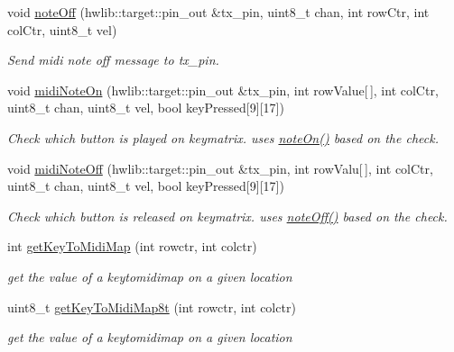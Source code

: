\begin{DoxyCompactItemize}
void \hyperlink{classlight_music_1_1midi_a6f47e6a388993c88f087a231a4e8f776}{note\+Off} (hwlib\+::target\+::pin\+\_\+out \&tx\+\_\+pin, uint8\+\_\+t chan, int row\+Ctr, int col\+Ctr, uint8\+\_\+t vel)
\begin{DoxyCompactList}\small\item\em Send midi note off message to tx\+\_\+pin. \end{DoxyCompactList}\item 
void \hyperlink{classlight_music_1_1midi_acc93cbd42e1d1257644f0102283b3db3}{midi\+Note\+On} (hwlib\+::target\+::pin\+\_\+out \&tx\+\_\+pin, int row\+Value\mbox{[}$\,$\mbox{]}, int col\+Ctr, uint8\+\_\+t chan, uint8\+\_\+t vel, bool key\+Pressed\mbox{[}9\mbox{]}\mbox{[}17\mbox{]})
\begin{DoxyCompactList}\small\item\em Check which button is played on keymatrix. uses \hyperlink{classlight_music_1_1midi_a01bcd1c91476ac59cc6be090b2b1daef}{note\+On()} based on the check. \end{DoxyCompactList}\item 
void \hyperlink{classlight_music_1_1midi_ae36edf372f74e28dabe879dc7600494a}{midi\+Note\+Off} (hwlib\+::target\+::pin\+\_\+out \&tx\+\_\+pin, int row\+Valu\mbox{[}$\,$\mbox{]}, int col\+Ctr, uint8\+\_\+t chan, uint8\+\_\+t vel, bool key\+Pressed\mbox{[}9\mbox{]}\mbox{[}17\mbox{]})
\begin{DoxyCompactList}\small\item\em Check which button is released on keymatrix. uses \hyperlink{classlight_music_1_1midi_a6f47e6a388993c88f087a231a4e8f776}{note\+Off()} based on the check. \end{DoxyCompactList}\item 
int \hyperlink{classlight_music_1_1midi_a8648ced30cbd9b89fb336fe874fc1102}{get\+Key\+To\+Midi\+Map} (int rowctr, int colctr)
\begin{DoxyCompactList}\small\item\em get the value of a keytomidimap on a given location \end{DoxyCompactList}\item 
uint8\+\_\+t \hyperlink{classlight_music_1_1midi_a974ccfcfc13bf4dff0743ebe7d832eed}{get\+Key\+To\+Midi\+Map8t} (int rowctr, int colctr)
\begin{DoxyCompactList}\small\item\em get the value of a keytomidimap on a given location \end{DoxyCompactList}\item 

\end{DoxyCompactItemize}
